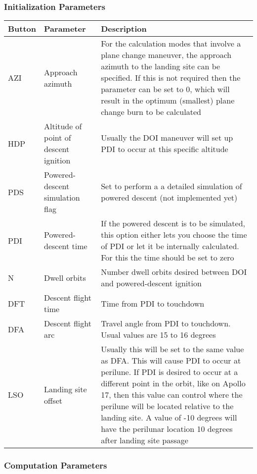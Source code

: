 \documentclass[11pt]{article} %
\begin{document}
\subsubsection{Initialization Parameters}
\begin{center}
\begin{tabular}{ | m{1cm} | m{4cm} | m{8.5cm} |}
\hline
Button&Parameter&Description\\
\hline
AZI&Approach azimuth&For the calculation modes that involve a plane change maneuver, the approach azimuth to the landing site can be specified. If this is not required then the parameter can be set to 0, which will result in the optimum (smallest) plane change burn to be calculated\\
\hline
HDP&Altitude of point of descent ignition&Usually the DOI maneuver will set up PDI to occur at this specific altitude\\
\hline
PDS&Powered-descent simulation flag&Set to perform a a detailed simulation of powered descent (not implemented yet)\\
\hline
PDI&Powered-descent time&If the powered descent is to be simulated, this option either lets you choose the time of PDI or let it be internally calculated. For this the time should be set to zero\\
\hline
N&Dwell orbits&Number dwell orbits desired between DOI and powered-descent ignition\\
\hline
DFT&Descent flight time&Time from PDI to touchdown\\
\hline
DFA&Descent flight arc&Travel angle from PDI to touchdown. Usual values are 15 to 16 degrees\\
\hline
LSO&Landing site offset&Usually this will be set to the same value as DFA. This will cause PDI to occur at perilune. If PDI is desired to occur at a different point in the orbit, like on Apollo 17, then this value can control where the perilune will be located relative to the landing site. A value of -10 degrees will have the perilunar location 10 degrees after landing site passage\\
\hline
\end{tabular}
\end{center}
\newpage
\subsubsection{Computation Parameters}
\end{document}
